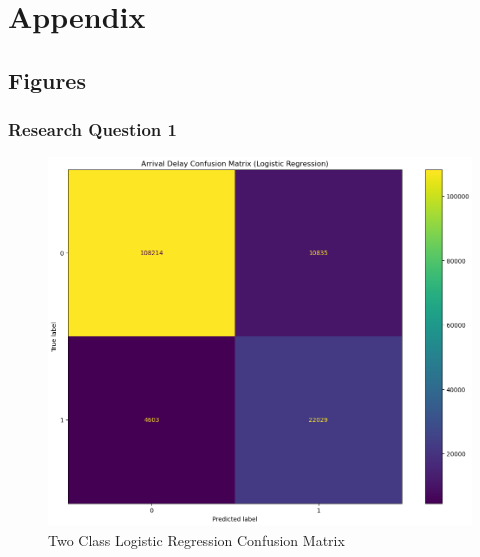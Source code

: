 \documentclass[a4paper,12pt]{article}
\begin{document}
\section{Appendix}

\subsection{Figures}

\subsubsection{Research Question 1} 

\begin{figure}
    \centering
    \includegraphics*[scale=.40]{../../img/model_rq1_cfmtrx.png}
    \caption[]{Two Class Logistic Regression Confusion Matrix}
    \label{fig:model:rq1:cfmtrx}
\end{figure}
\end{document}
